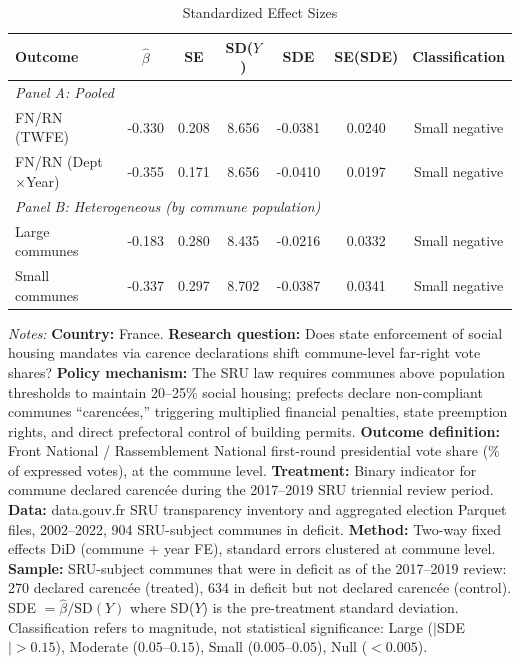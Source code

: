 \begin{table}[t]
\centering
\caption{Standardized Effect Sizes}
\label{tab:sde}
\small
\begin{tabular}{lcccccc}
\toprule
Outcome & $\hat{\beta}$ & SE & SD($Y$) & SDE & SE(SDE) & Classification \\
\midrule
\multicolumn{7}{l}{\textit{Panel A: Pooled}} \\
FN/RN (TWFE) & -0.330 & 0.208 & 8.656 & -0.0381 & 0.0240 & Small negative \\
FN/RN (Dept$\times$Year) & -0.355 & 0.171 & 8.656 & -0.0410 & 0.0197 & Small negative \\
\midrule
\multicolumn{7}{l}{\textit{Panel B: Heterogeneous (by commune population)}} \\
Large communes & -0.183 & 0.280 & 8.435 & -0.0216 & 0.0332 & Small negative \\
Small communes & -0.337 & 0.297 & 8.702 & -0.0387 & 0.0341 & Small negative \\
\bottomrule
\end{tabular}
\begin{tablenotes}
\item \textit{Notes:} \textbf{Country:} France. \textbf{Research question:} Does state enforcement of social housing mandates via carence declarations shift commune-level far-right vote shares? \textbf{Policy mechanism:} The SRU law requires communes above population thresholds to maintain 20--25\% social housing; prefects declare non-compliant communes ``carenc\'{e}es,'' triggering multiplied financial penalties, state preemption rights, and direct prefectoral control of building permits. \textbf{Outcome definition:} Front National / Rassemblement National first-round presidential vote share (\% of expressed votes), at the commune level. \textbf{Treatment:} Binary indicator for commune declared carenc\'{e}e during the 2017--2019 SRU triennial review period. \textbf{Data:} data.gouv.fr SRU transparency inventory and aggregated election Parquet files, 2002--2022, 904 SRU-subject communes in deficit. \textbf{Method:} Two-way fixed effects DiD (commune + year FE), standard errors clustered at commune level. \textbf{Sample:} SRU-subject communes that were in deficit as of the 2017--2019 review: 270 declared carenc\'{e}e (treated), 634 in deficit but not declared carenc\'{e}e (control). SDE $= \hat{\beta} / \text{SD}(Y)$ where SD($Y$) is the pre-treatment standard deviation. Classification refers to magnitude, not statistical significance: Large ($|$SDE$| > 0.15$), Moderate ($0.05$--$0.15$), Small ($0.005$--$0.05$), Null ($< 0.005$). 
\end{tablenotes}
\end{table}

